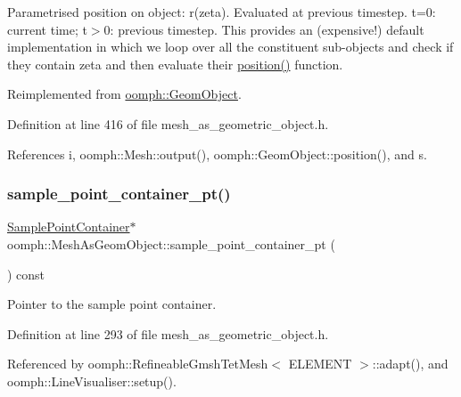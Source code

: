 Parametrised position on object\+: r(zeta). Evaluated at previous timestep. t=0\+: current time; t$>$0\+: previous timestep. This provides an (expensive!) default implementation in which we loop over all the constituent sub-\/objects and check if they contain zeta and then evaluate their \hyperlink{classoomph_1_1MeshAsGeomObject_ad071793f5cee36eef0e56dbeeebf4c24}{position()} function. 



Reimplemented from \hyperlink{classoomph_1_1GeomObject_ad44a736d23dcd63af163a7d80b5c4dfa}{oomph\+::\+Geom\+Object}.



Definition at line 416 of file mesh\+\_\+as\+\_\+geometric\+\_\+object.\+h.



References i, oomph\+::\+Mesh\+::output(), oomph\+::\+Geom\+Object\+::position(), and s.

\mbox{\label{classoomph_1_1MeshAsGeomObject_adddb31b09b4420410c5f722a6e629791}} 
\subsubsection{\texorpdfstring{sample\+\_\+point\+\_\+container\+\_\+pt()}{sample\_point\_container\_pt()}}
{\footnotesize\ttfamily \hyperlink{classSamplePointContainer}{Sample\+Point\+Container}$\ast$ oomph\+::\+Mesh\+As\+Geom\+Object\+::sample\+\_\+point\+\_\+container\+\_\+pt (\begin{DoxyParamCaption}{ }\end{DoxyParamCaption}) const\hspace{0.3cm}{\ttfamily [inline]}}



Pointer to the sample point container. 



Definition at line 293 of file mesh\+\_\+as\+\_\+geometric\+\_\+object.\+h.



Referenced by oomph\+::\+Refineable\+Gmsh\+Tet\+Mesh$<$ E\+L\+E\+M\+E\+N\+T $>$\+::adapt(), and oomph\+::\+Line\+Visualiser\+::setup().


